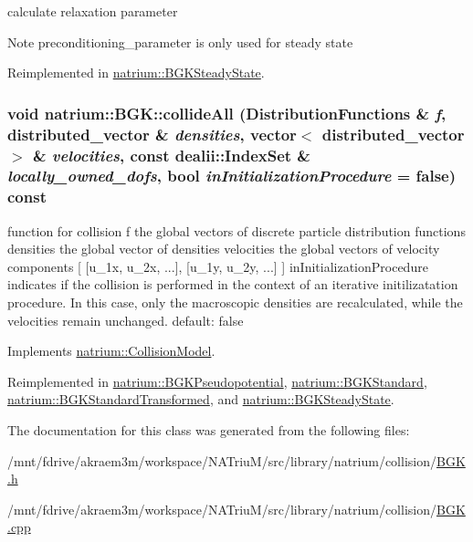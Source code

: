 calculate relaxation parameter \begin{DoxyNote}{Note}
preconditioning\_\-parameter is only used for steady state 
\end{DoxyNote}


Reimplemented in \hyperlink{classnatrium_1_1BGKSteadyState_a2cd6628c71475663e204656147de99b8}{natrium::BGKSteadyState}.\hypertarget{classnatrium_1_1BGK_a9fa1c980217a183fc4762954e86ba36d}{
\subsubsection[{collideAll}]{\setlength{\rightskip}{0pt plus 5cm}void natrium::BGK::collideAll ({\bf DistributionFunctions} \& {\em f}, \/  distributed\_\-vector \& {\em densities}, \/  vector$<$ distributed\_\-vector $>$ \& {\em velocities}, \/  const dealii::IndexSet \& {\em locally\_\-owned\_\-dofs}, \/  bool {\em inInitializationProcedure} = {\ttfamily false}) const}}
\label{classnatrium_1_1BGK_a9fa1c980217a183fc4762954e86ba36d}


function for collision f the global vectors of discrete particle distribution functions densities the global vector of densities velocities the global vectors of velocity components \mbox{[} \mbox{[}u\_\-1x, u\_\-2x, ...\mbox{]}, \mbox{[}u\_\-1y, u\_\-2y, ...\mbox{]} \mbox{]} inInitializationProcedure indicates if the collision is performed in the context of an iterative initilizatation procedure. In this case, only the macroscopic densities are recalculated, while the velocities remain unchanged. default: false 

Implements \hyperlink{classnatrium_1_1CollisionModel}{natrium::CollisionModel}.

Reimplemented in \hyperlink{classnatrium_1_1BGKPseudopotential_a5f40f5076273f9ec38f3078c891b453c}{natrium::BGKPseudopotential}, \hyperlink{classnatrium_1_1BGKStandard_a8e0493b063d56275d7ee607e25c4145e}{natrium::BGKStandard}, \hyperlink{classnatrium_1_1BGKStandardTransformed_aaa2e752c6aa2294f1ebeb9d326ba9eb8}{natrium::BGKStandardTransformed}, and \hyperlink{classnatrium_1_1BGKSteadyState_a8554fb624c5a3abe01651747b3d9aeb7}{natrium::BGKSteadyState}.

The documentation for this class was generated from the following files:\begin{DoxyCompactItemize}
\item 
/mnt/fdrive/akraem3m/workspace/NATriuM/src/library/natrium/collision/\hyperlink{BGK_8h}{BGK.h}\item 
/mnt/fdrive/akraem3m/workspace/NATriuM/src/library/natrium/collision/\hyperlink{BGK_8cpp}{BGK.cpp}\end{DoxyCompactItemize}

